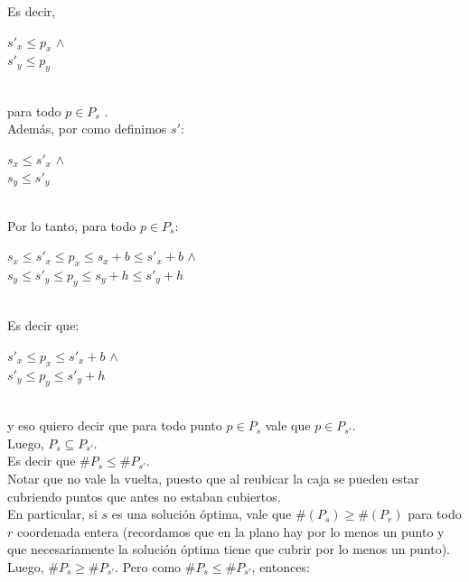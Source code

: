 \indent Es decir,\\ 

\begin{center}
$s'_{x} \leq p_{x}$  $\wedge$ \\
$s'_{y} \leq p_{y}$  \\
\end{center}\\
 
para todo $p \in P_{s}$ .\\

\indent Adem\'as, por como definimos $s'$:\\
\begin{center}
$s_{x} \leq s'_{x} $  $\wedge$ \\
$s_{y} \leq s'_{y}$\\
\end{center}\\

\indent Por lo tanto, para todo $p \in P_{s}$:\\
\begin{center}
$s_{x} \leq s'_{x} \leq p_{x} \leq s_{x} + b  \leq s'_{x} + b$  $\wedge$ \\
$s_{y} \leq s'_{y} \leq p_{y} \leq s_{y} + h  \leq s'_{y} + h$\\
\end{center}\\

\indent Es decir que:\\
\begin{center}
$s'_{x} \leq p_{x} \leq s'_{x} + b$  $\wedge$ \\
$s'_{y} \leq p_{y} \leq s'_{y} + h$\\
\end{center}\\

y eso quiero decir que para todo punto $p \in P_{s} $ vale que $ p \in P_{s'}$. \\
\indent Luego, $P_{s} \subseteq P_{s'}.$\\
\indent Es decir que $\#P_{s} \leq \#P_{s'}$. \\
\indent Notar que no vale la vuelta, puesto que al reubicar la caja se pueden estar cubriendo puntos que antes no estaban cubiertos.\\
\indent En particular, si $s$ es una soluci\'on \'optima, vale que $\#(P_{s}) \geq \#(P_{r}) $ para todo $r$ coordenada entera (recordamos que en la plano hay por lo menos un punto y que necesariamente la soluci\'on \'optima tiene que cubrir por lo menos un punto).\\
\indent Luego, $\#P_{s} \geq \#P_{s'}$. Pero como $\#P_{s} \leq \#P_{s'}$, entonces:\\

